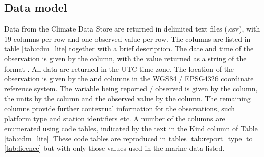 \subsection{Data model}
Data from the Climate Data Store are returned in delimited text files (.csv), with 19 columns per row and one observed value per row. 
The columns are listed in table \ref{tab:cdm_lite} together with a brief description.  
The date and time of the observation is given by the  column, with the value returned as a string of the format . 
All data are returned in the UTC time zone.
The location of the observation is given by the  and  columns in the WGS84 / EPSG4326 coordinate reference system. 
The variable being reported / observed is given by the  column, the units by the  column and the observed value by the  column. 
The remaining columns provide further contextual information for the observations, such platform type and station identifiers etc. 
A number of the columns are enumerated using code tables, indicated by the text  in the Kind column of Table \ref{tab:cdm_lite}.
These code tables are reproduced in tables \ref{tab:report_type} to \ref{tab:licence} but with only those values used in the marine data listed.

